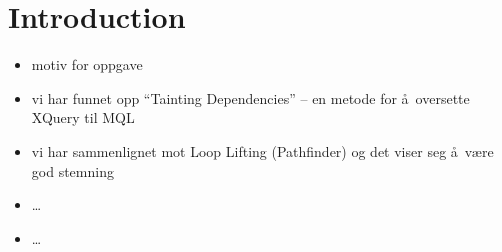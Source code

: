 \chapter{Introduction}
\label{chapter:introduction}
\begin{itemize}
  \item motiv for oppgave
  \item vi har funnet opp ``Tainting Dependencies'' -- en metode for \aa~oversette XQuery til MQL
  \item vi har sammenlignet mot Loop Lifting (Pathfinder) og det viser seg \aa~v\ae re god stemning
  \item \ldots
  \item \ldots 
\end{itemize}
